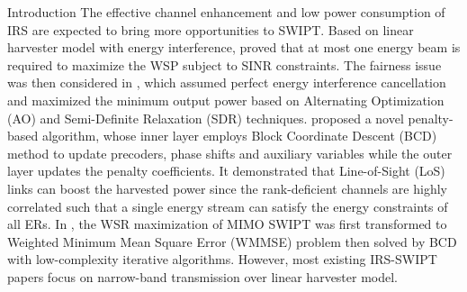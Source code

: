 \documentclass{IEEEtran}
\begin{document}
\begin{section}{Introduction}
	The effective channel enhancement and low power consumption of IRS are expected to bring more opportunities to SWIPT. Based on linear harvester model with energy interference, \cite{Wu2019b} proved that at most one energy beam is required to maximize the WSP subject to SINR constraints. The fairness issue was then considered in \cite{Tang2019}, which assumed perfect energy interference cancellation and maximized the minimum output power based on Alternating Optimization (AO) and Semi-Definite Relaxation (SDR) techniques. \cite{Wu2019c} proposed a novel penalty-based algorithm, whose inner layer employs Block Coordinate Descent (BCD) method to update precoders, phase shifts and auxiliary variables while the outer layer updates the penalty coefficients. It demonstrated that Line-of-Sight (LoS) links can boost the harvested power since the rank-deficient channels are highly correlated such that a single energy stream can satisfy the energy constraints of all ERs. In \cite{Pan2019a}, the WSR maximization of MIMO SWIPT was first transformed to Weighted Minimum Mean Square Error (WMMSE) problem then solved by BCD with low-complexity iterative algorithms. However, most existing IRS-SWIPT papers focus on narrow-band transmission over linear harvester model.
\end{section}
\end{document}
